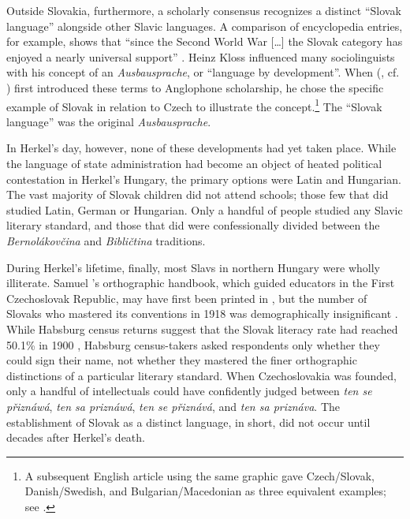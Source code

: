 Outside Slovakia, furthermore, a scholarly consensus recognizes a distinct \linebreak{}“Slovak language” alongside other Slavic languages. A comparison of encyclopedia entries, for example, shows that “since the Second World War […] the Slovak category has enjoyed a nearly universal support” \citep[37]{maxwell_taxonomies_2015}. Heinz Kloss influenced many sociolinguists with his concept of an \textit{Ausbausprache}, or “language by development”. When \citeauthor{kloss_abstandsprachen_1967} (\citeyear[32]{kloss_abstandsprachen_1967}, cf. \citeyear[311]{kloss_abstandsprachen_1976}) first introduced these terms to Anglophone scholarship, he chose the specific example of Slovak in relation to Czech to illustrate the concept.\footnote{A subsequent English article using the same graphic gave Czech/Slovak, Danish/Swedish, and Bulgarian/Macedonian as three equivalent examples; see \citet[160]{kloss_abstand_1993}.} The “Slovak language” was the original \textit{Ausbausprache}.

In Herkel’s day, however, none of these developments had yet taken place. While the language of state administration had become an object of heated political contestation in Herkel’s Hungary, the primary options were Latin and Hungarian. The vast majority of Slovak children did not attend schools; those few that did studied Latin, German or Hungarian. Only a handful of people studied any Slavic literary standard, and those that did were confessionally divided between the \textit{Bernolákovčina} and \textit{Bibličtina} traditions.

During Herkel’s lifetime, finally, most Slavs in northern Hungary were wholly illiterate. Samuel \citeauthor{czambel_slovensky_1890}’s orthographic handbook, which guided educators in the First Czechoslovak Republic, may have first been printed in \citeyear{czambel_slovensky_1890}, but the number of Slovaks who mastered its conventions in 1918 was demographically insignificant \citep[150]{maxwell_choosing_2009}. While Habsburg census returns suggest that the Slovak literacy rate had reached 50.1\% in 1900 \citep[146, 166]{kuzmin_vyvoj_1981}, Habsburg census-takers asked respondents only whether they could sign their name, not whether they mastered the finer orthographic distinctions of a particular literary standard. When Czechoslovakia was founded, only a handful of intellectuals could have confidently judged between \textit{ten se přiznáwá}, \textit{ten sa priznáwá}, \textit{ten se přiznává}, and \textit{ten sa priznáva}. The establishment of Slovak as a distinct language, in short, did not occur until decades after Herkel’s death.

